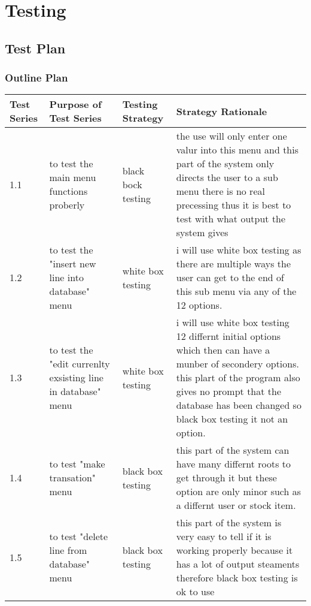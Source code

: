 \chapter{Testing}

\section{Test Plan}

\begin{landscape}

\subsection{Outline Plan}

\begin{center}
    \begin{tabular}{|p{2cm}|p{5cm}|p{5cm}|p{4cm}|}
        \hline
        \textbf{Test Series} & \textbf{Purpose of Test Series} & \textbf{Testing Strategy} & \textbf{Strategy Rationale}\\  \hline

        1.1 & to test the main menu functions proberly  & black bock testing & the use will only enter one valur into this menu and this part of the system only directs the user to a sub menu there is no real precessing thus it is best to test with what output the system gives \\ \hline
1.2 &to test the "insert new line into database" menu & white box testing & i will use white box testing as there are multiple ways the user can get to the end of this sub menu via any of the 12 options.\\ \hline
1.3 & to test the "edit currenlty exsisting line in database" menu & white box testing & i will use white box testing 12 differnt initial options which then can have a munber of secondery options. this plart of the program also gives no prompt that the database has been changed so black box testing it not an option. \\ \hline
1.4 & to test "make transation" menu & black box testing & this part of the system can have many differnt roots to get through it but these option are only minor such as a differnt user or stock item. \\ \hline
1.5 & to test "delete line from database" menu & black box testing & this part of the system is very easy to tell if it is working properly because it has a lot of output steaments therefore black box testing is ok to use \\ \hline


\end{tabular}
\end{center}
\end{landscape}
